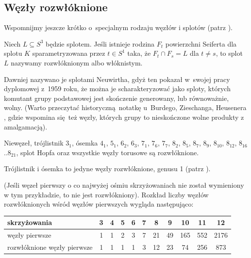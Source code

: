 %

\subsection{Węzły rozwłóknione}
%
%
Wspomnijmy jeszcze krótko o~specjalnym rodzaju węzłów i splotów (patrz \cite[s. 49-50]{kawauchi1996}).

\begin{definition}
    Niech $L \subseteq S^3$ będzie splotem.
    Jeśli istnieje rodzina $F_t$ powierzchni Seiferta dla splotu $K$ sparametryzowana przez $t \in S^1$ taka, że $F_t \cap F_s = L$ dla $t \neq s$, to splot $L$ nazywamy rozwłóknionym albo włóknistym.
\end{definition}

%
Dawniej nazywano je splotami Neuwirtha, gdyż ten pokazał w~swojej pracy dyplomowej z~1959 roku, że można je scharakteryzować jako sploty, których komutant grupy podstawowej jest skończenie generowany, lub równoważnie, wolny.
(Warto przeczytać historyczną notatkę u~Burdego, Zieschanga, Heusenera \cite[s. 68]{burde2014}, gdzie wspomina się też węzły, których grupy to nieskończone wolne produkty z amalgamacją).

\begin{example}
    Niewęzeł, trójlistnik $3_1$, ósemka $4_1$, $5_{1}$, $6_{2}$, $6_{3}$, $7_{1}$, $7_{6}$, $7_{7}$, $8_{2}$, $8_{5}$, $8_{7}$, $8_{9}$, $8_{10}$, $8_{12}$, $8_{16}$..$8_{21}$, splot Hopfa oraz wszystkie węzły torusowe są rozwłóknione.

    Trójlistnik i ósemka to jedyne węzły rozwłóknione, genusu 1 (patrz \cite[s. 79]{burde2014}).
\end{example}

(Jeśli węzeł pierwszy o co najwyżej ośmiu skrzyżowaniach nie został wymieniony w tym przykładzie, to nie jest rozwłókniony).
Rozkład liczby węzłów rozwłóknionych wśród węzłów pierwszych wygląda następująco:

\renewcommand*{\arraystretch}{1.4}
\footnotesize
\begin{longtable}{lcccccccccc}
    \hline
    \textbf{skrzyżowania} & 3 & 4 & 5 & 6 & 7 & 8 & 9 & 10 &  11 &  12 \\ \hline \endhead
    węzły pierwsze & 1 & 1 & 2 & 3 & 7 & 21 & 49 & 165 & 552 & 2176 \\
    rozwłóknione węzły pierwsze & 1 & 1 & 1 & 1 & 3 & 12 & 23 & 74 & 256 & 873 \\
    \hline
\end{longtable}
\normalsize

